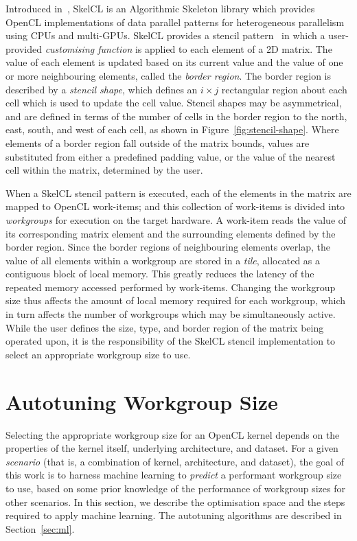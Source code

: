 \documentclass[preprint,nonatbib,10pt]{sigplanconf}
\begin{document}
Introduced in~\cite{Steuwer2011}, SkelCL is an Algorithmic Skeleton
library which provides OpenCL implementations of data parallel
patterns for heterogeneous parallelism using CPUs and
multi-GPUs. SkelCL provides a stencil pattern~\cite{Breuer2014a} in
which a user-provided \emph{customising function} is applied to each
element of a 2D matrix. The value of each element is updated based on
its current value and the value of one or more neighbouring elements,
called the \emph{border region}. The border region is described by a
\emph{stencil shape}, which defines an $i \times j$ rectangular region
about each cell which is used to update the cell value. Stencil shapes
may be asymmetrical, and are defined in terms of the number of cells
in the border region to the north, east, south, and west of each cell,
as shown in Figure~\ref{fig:stencil-shape}. Where elements of a border
region fall outside of the matrix bounds, values are substituted from
either a predefined padding value, or the value of the nearest cell
within the matrix, determined by the user.

When a SkelCL stencil pattern is executed, each of the elements in the
matrix are mapped to OpenCL work-items; and this collection of
work-items is divided into \emph{workgroups} for execution on the
target hardware. A work-item reads the value of its corresponding
matrix element and the surrounding elements defined by the border
region. Since the border regions of neighbouring elements overlap, the
value of all elements within a workgroup are stored in a \emph{tile},
allocated as a contiguous block of local memory. This greatly reduces
the latency of the repeated memory accessed performed by
work-items. Changing the workgroup size thus affects the amount of
local memory required for each workgroup, which in turn affects the
number of workgroups which may be simultaneously active. While the
user defines the size, type, and border region of the matrix being
operated upon, it is the responsibility of the SkelCL stencil
implementation to select an appropriate workgroup size to use.


\section{Autotuning Workgroup Size}

Selecting the appropriate workgroup size for an OpenCL kernel depends
on the properties of the kernel itself, underlying architecture, and
dataset. For a given \emph{scenario} (that is, a combination of
kernel, architecture, and dataset), the goal of this work is to
harness machine learning to \emph{predict} a performant workgroup size
to use, based on some prior knowledge of the performance of workgroup
sizes for other scenarios. In this section, we describe the
optimisation space and the steps required to apply machine
learning. The autotuning algorithms are described in
Section~\ref{sec:ml}.
\end{document}
